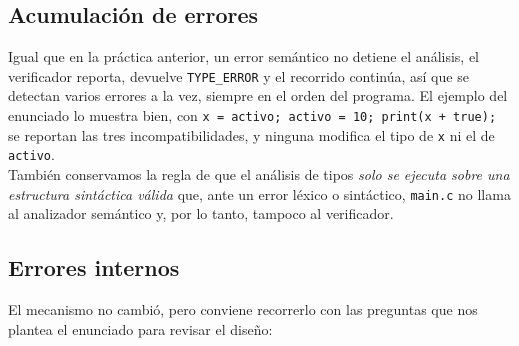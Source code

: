 \documentclass[12pt,letterpaper]{article}
\begin{document}
\subsection*{Acumulación de errores}

Igual que en la práctica anterior, un error semántico no detiene el análisis, el verificador reporta, devuelve
\texttt{TYPE\_ERROR} y el recorrido continúa, así que se detectan varios errores a la vez, siempre en el orden
del programa. El ejemplo del enunciado lo muestra bien, con \texttt{x = activo; activo = 10; print(x + true);}
se reportan las tres incompatibilidades, y ninguna modifica el tipo de \texttt{x} ni el de \texttt{activo}.\\

También conservamos la regla de que el análisis de tipos \emph{solo se ejecuta sobre una estructura sintáctica
válida} que, ante un error léxico o sintáctico, \texttt{main.c} no llama al analizador semántico y, por lo
tanto, tampoco al verificador.

\subsection*{Errores internos}

El mecanismo no cambió, pero conviene recorrerlo con las preguntas que nos plantea el enunciado para revisar el
diseño:
\end{document}

